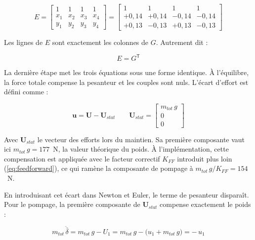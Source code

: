 \begin{equation}
    E = \begin{bmatrix}
        1   & 1   & 1   & 1   \\
        x_1 & x_2 & x_3 & x_4 \\
        y_1 & y_2 & y_3 & y_4
    \end{bmatrix}
    = \begin{bmatrix}
        1       & 1       & 1       & 1       \\
        +0{,}14 & +0{,}14 & -0{,}14 & -0{,}14 \\
        +0{,}13 & -0{,}13 & +0{,}13 & -0{,}13
    \end{bmatrix}
\end{equation}

Les lignes de $E$ sont exactement les colonnes de $G$. Autrement dit :

\begin{equation}
    E = G^{\mathsf T}
\end{equation}

La dernière étape met les trois équations sous une forme identique. À l'équilibre, la force totale compense la pesanteur et les couples sont nuls. L'écart d'effort est défini comme :

\begin{equation}
    \boldsymbol{u} = \boldsymbol{U} - \boldsymbol{U}_{stat}
    \qquad
    \boldsymbol{U}_{stat} =
    \begin{bmatrix} m_{tot}\,g \\ 0 \\ 0 \end{bmatrix}
\end{equation}

Avec $\boldsymbol{U}_{stat}$ le vecteur des efforts lors du maintien. Sa première composante vaut ici $m_{tot}\,g = 177$~N, la valeur théorique du poids. À l'implémentation, cette compensation est appliquée avec le facteur correctif $K_{FF}$ introduit plus loin (\autoref{eq:feedforward}), ce qui ramène la composante de pompage à $m_{tot}\,g / K_{FF} = 154$~N.

En introduisant cet écart dans Newton et Euler, le terme de pesanteur disparaît. Pour le pompage, la première composante de $\boldsymbol{U}_{stat}$ compense exactement le poids :

\begin{equation*}
    m_{tot}\,\ddot{\bar\delta}
    = m_{tot}\,g - U_1
    = m_{tot}\,g - \bigl(u_1 + m_{tot}\,g\bigr)
    = -\,u_1
\end{equation*}

